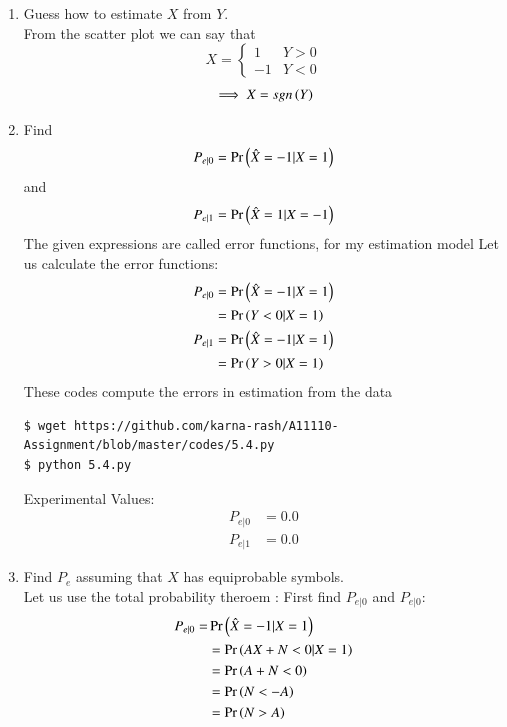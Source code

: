\documentclass[journal,12pt,twocolumn]{IEEEtran}
\renewcommand\thesection{\arabic{section}}
\begin{document}
\begin{enumerate}[label=\thesection.\arabic*
,ref=\thesection.\theenumi]
\begin{figure}
\caption{The Scatter plot of $Y$}
\label{fig:Scatter Plot of Y}
\end{figure}
	\item Guess how to estimate $X$ from $Y$.\\
	\solution
	From the scatter plot we can say that 
	\begin{equation}
	X=\begin{cases}
	1 & Y >0 \\
	-1 & Y<0
	\end{cases}
	\end{equation}
	\begin{align}
	\implies X=sgn\left(Y\right)
	\end{align}
\item
\label{ml-ch4_sim}
Find 
\begin{equation}
	P_{e|0} = \Pr\left(\hat{X} = -1|X=1\right)
\end{equation}
and 
\begin{equation}
	P_{e|1} = \Pr\left(\hat{X} = 1|X=-1\right)
\end{equation}
%
\solution The given expressions are called error functions, for my estimation model Let us calculate the error functions:
\begin{align}
P_{e|0} &= \Pr\left(\hat{X} = -1|X=1\right) \\
        &= \Pr\left(Y<0 |X=1\right) \\
P_{e|1} &= \Pr\left(\hat{X} = -1|X=1\right) \\
        &= \Pr\left(Y>0 |X=1\right)
\end{align}
These codes compute the errors in estimation from the data
\begin{lstlisting}
$ wget https://github.com/karna-rash/A11110-Assignment/blob/master/codes/5.4.py
$ python 5.4.py
	\end{lstlisting}
Experimental Values:
\begin{align}
P_{e|0}&= 0.0\\
P_{e|1}&= 0.0
\end{align}
\item Find $P_e$ assuming that $X$ has equiprobable symbols.\\
\solution Let us use the total probability theroem :
First find $P_{e|0}$ and $P_{e|0}$:
\begin{align}
P_{e|0}=&\pr{\hat{X} = -1|X=1}\\
&=\pr{AX+N<0 |X=1} \\
&=\pr{A+N<0} \\
&=\pr{N<-A} \\
&=\pr{N > A} \\

\end{align}
\end{enumerate}
\end{document}
